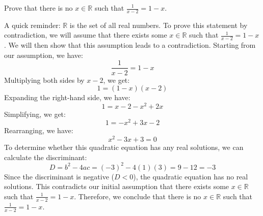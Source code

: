 \begin{exercise}[Hard]
    Prove that there is no $x \in \mathbb{R}$ such that $\frac{1}{x-2} = 1-x$.
\end{exercise}
\begin{answer}
    A quick reminder: $\mathbb{R}$ is the set of all real numbers. To prove this statement by contradiction, we will assume that
    there exists some $x \in \mathbb{R}$ such that $\frac{1}{x-2} = 1-x$. We will then show that this assumption leads to a contradiction.
    \newline\newline
    Starting from our assumption, we have:
    \begin{equation*}
        \frac{1}{x-2} = 1-x
    \end{equation*}
    Multiplying both sides by $x-2$, we get:
    \begin{equation*}
        1 = (1-x)(x-2)
    \end{equation*}
    Expanding the right-hand side, we have:
    \begin{equation*}
        1 = x - 2 - x^2 + 2x
    \end{equation*}
    Simplifying, we get:
    \begin{equation*}
        1 = -x^2 + 3x - 2
    \end{equation*}
    Rearranging, we have:
    \begin{equation*}
        x^2 - 3x + 3 = 0
    \end{equation*}
    To determine whether this quadratic equation has any real solutions, we can calculate the discriminant:
    \begin{equation*}
        D = b^2 - 4ac = (-3)^2 - 4(1)(3) = 9 - 12 = -3
    \end{equation*}
    Since the discriminant is negative ($D < 0$), the quadratic equation has no real solutions. This contradicts 
    our initial assumption that there exists some $x \in \mathbb{R}$ such that $\frac{1}{x-2} = 1-x$. 
    Therefore, we conclude that there is no $x \in \mathbb{R}$ such that $\frac{1}{x-2} = 1-x$.
\end{answer}